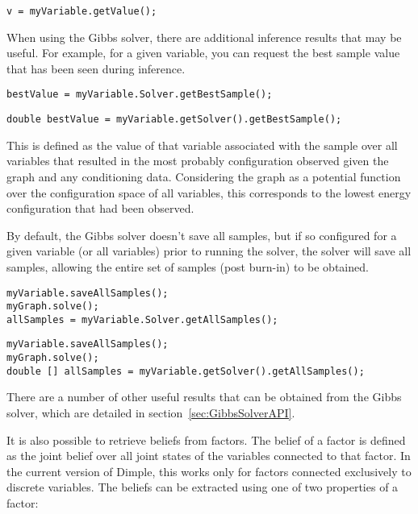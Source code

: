 \fi

\ifjava
\begin{lstlisting}
v = myVariable.getValue();
\end{lstlisting}
\fi

When using the Gibbs solver, there are additional inference results that may be useful.  For example, for a given variable, you can request the best sample value that has been seen during inference.

\ifmatlab
\begin{lstlisting}
bestValue = myVariable.Solver.getBestSample();
\end{lstlisting}
\fi

\ifjava
\begin{lstlisting}
double bestValue = myVariable.getSolver().getBestSample();
\end{lstlisting}
\fi

This is defined as the value of that variable associated with the sample over all variables that resulted in the most probably configuration observed given the graph and any conditioning data. Considering the graph as a potential function over the configuration space of all variables, this corresponds to the lowest energy configuration that had been observed.

By default, the Gibbs solver doesn't save all samples, but if so configured for a given variable (or all variables) prior to running the solver, the solver will save all samples, allowing the entire set of samples (post burn-in) to be obtained.

\ifmatlab
\begin{lstlisting}
myVariable.saveAllSamples();
myGraph.solve();
allSamples = myVariable.Solver.getAllSamples();
\end{lstlisting}
\fi

\ifjava
\begin{lstlisting}
myVariable.saveAllSamples();
myGraph.solve();
double [] allSamples = myVariable.getSolver().getAllSamples();
\end{lstlisting}
\fi

There are a number of other useful results that can be obtained from the Gibbs solver, which are detailed in section~\ref{sec:GibbsSolverAPI}.

It is also possible to retrieve beliefs from factors.  The belief of a factor is defined as the joint belief over all joint states of the variables connected to that factor.  In the current version of Dimple, this works only for factors connected exclusively to discrete variables.  The beliefs can be extracted using one of two properties of a factor:

